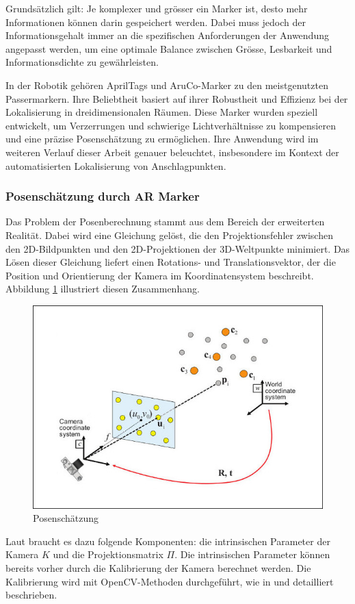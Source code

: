 Grundsätzlich gilt: Je komplexer und grösser ein Marker ist, desto mehr Informationen können
darin gespeichert werden. Dabei muss jedoch der Informationsgehalt immer an die spezifischen 
Anforderungen der Anwendung angepasst werden, um eine optimale Balance zwischen Grösse, Lesbarkeit 
und Informationsdichte zu gewährleisten.

In der Robotik gehören AprilTags und AruCo-Marker zu den meistgenutzten Passermarkern. 
Ihre Beliebtheit basiert auf ihrer Robustheit und Effizienz bei der Lokalisierung in 
dreidimensionalen Räumen. Diese Marker wurden speziell entwickelt, um Verzerrungen und 
schwierige Lichtverhältnisse zu kompensieren und eine präzise Posenschätzung zu ermöglichen. 
Ihre Anwendung wird im weiteren Verlauf dieser Arbeit genauer beleuchtet, insbesondere im 
Kontext der automatisierten Lokalisierung von Anschlagpunkten.
\clearpage
\subsubsection{Posenschätzung durch AR Marker}
Das Problem der Posenberechnung stammt aus dem Bereich der erweiterten 
Realität. Dabei wird eine Gleichung gelöst, die den Projektionsfehler 
zwischen den 2D-Bildpunkten und den 2D-Projektionen der 3D-Weltpunkte minimiert. 
Das Lösen dieser Gleichung liefert einen Rotations- und Translationsvektor, der 
die Position und Orientierung der Kamera im Koordinatensystem beschreibt. 
Abbildung \ref{fig:pose} illustriert diesen Zusammenhang.

\begin{figure}[H]
    \centering
    \includegraphics[width=0.4\linewidth]{graphics/pose.png}
    \caption{Posenschätzung}
    \label{fig:pose}
\end{figure}

Laut \cite{pose} braucht es dazu folgende Komponenten: die intrinsischen Parameter 
der Kamera \( K \) und die Projektionsmatrix \( \Pi \). Die intrinsischen Parameter 
können bereits vorher durch die Kalibrierung der Kamera berechnet werden. Die Kalibrierung 
wird mit OpenCV-Methoden durchgeführt, wie in \cite{zhang} und \cite{bradski} detailliert 
beschrieben.

